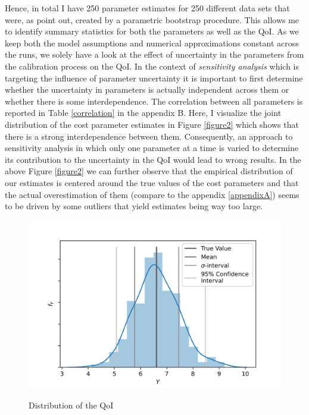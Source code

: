 Hence, in total I have 250 parameter estimates for 250 different data sets that were, as \cite{Su.Judd.2012} point out, created by a parametric bootstrap procedure. This allows me to identify summary statistics for both the parameters as well as the QoI. As we keep both the model assumptions and numerical approximations constant across the runs, we solely have a look at the effect of uncertainty in the parameters from the calibration process on the QoI. In the context of \textit{sensitivity analysis} which is targeting the influence of parameter uncertainty it is important to first determine whether the uncertainty in parameters is actually independent across them or whether there is some interdependence. The correlation between all parameters is reported in Table \ref{correlation} in the appendix B. Here, I visualize the joint distribution of the cost parameter estimates in Figure \ref{figure2} which shows that there is a strong interdependence between them. Consequently, an approach to sensitivity analysis in which only one parameter at a time is varied to determine its contribution to the uncertainty in the QoI would lead to wrong results. In the above Figure \ref{figure2} we can further observe that the empirical distribution of our estimates is centered around the true values of the cost parameters and that the actual overestimation of them (compare to the appendix \ref{appendixA}) seems to be driven by some outliers that yield estimates being way too large.

\begin{figure}[!t]
	\caption{Distribution of the QoI}
	\vspace*{-4mm}
	\centering
	\includegraphics[scale=0.9]{../figures/figure_3.png}
	\label{figure3}
\end{figure}

